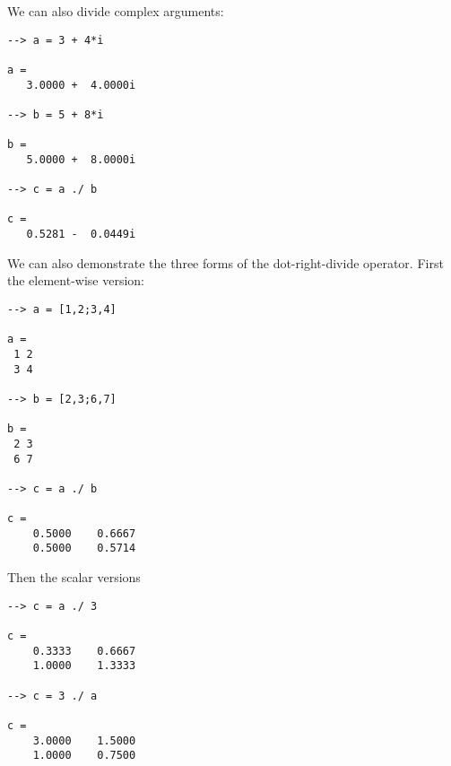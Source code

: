 We can also divide complex arguments:
\begin{verbatim}
--> a = 3 + 4*i

a = 
   3.0000 +  4.0000i 

--> b = 5 + 8*i

b = 
   5.0000 +  8.0000i 

--> c = a ./ b

c = 
   0.5281 -  0.0449i 
\end{verbatim}
We can also demonstrate the three forms of the dot-right-divide operator.  First
the element-wise version:
\begin{verbatim}
--> a = [1,2;3,4]

a = 
 1 2 
 3 4 

--> b = [2,3;6,7]

b = 
 2 3 
 6 7 

--> c = a ./ b

c = 
    0.5000    0.6667 
    0.5000    0.5714 
\end{verbatim}
Then the scalar versions
\begin{verbatim}
--> c = a ./ 3

c = 
    0.3333    0.6667 
    1.0000    1.3333 

--> c = 3 ./ a

c = 
    3.0000    1.5000 
    1.0000    0.7500 
\end{verbatim}
